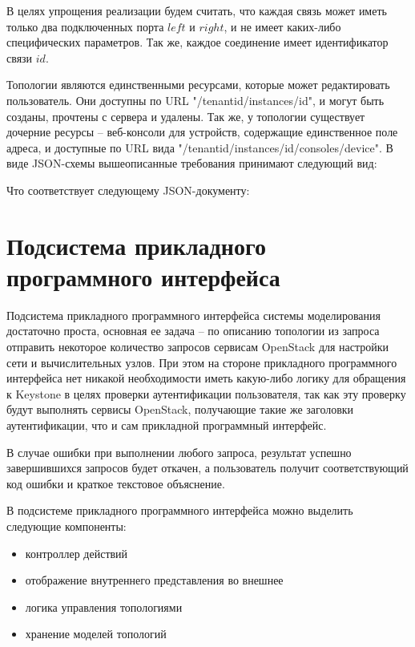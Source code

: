 В целях упрощения реализации будем считать, что каждая связь может иметь только два 
подключенных порта  $left$ и $right$, и не имеет каких-либо специфических параметров.
Так же, каждое соединение имеет идентификатор связи $id$.

Топологии являются единственными ресурсами, которые может редактировать пользователь.
Они доступны по URL "/{tenantid}/instances/{id}", и могут быть созданы, прочтены с сервера и удалены.
Так же, у топологии существует дочерние ресурсы -- веб-консоли для устройств,
содержащие единственное поле адреса, и доступные по URL вида "/{tenantid}/instances/{id}/consoles/{device}".
В виде JSON-схемы вышеописанные требования принимают следующий вид:



Что соответствует следующему JSON-документу:




\section{Подсистема прикладного программного интерфейса}
Подсистема прикладного программного интерфейса системы моделирования достаточно проста,
основная ее задача -- по описанию топологии из запроса отправить некоторое количество
запросов сервисам OpenStack для настройки сети и вычислительных узлов.
При этом на стороне прикладного программного интерфейса нет никакой необходимости 
иметь какую-либо логику для обращения к Keystone в целях проверки аутентификации пользователя,
так как эту проверку будут выполнять сервисы OpenStack, получающие такие же заголовки
аутентификации, что и сам прикладной программный интерфейс.

В случае ошибки при выполнении любого запроса, результат успешно завершившихся запросов
будет откачен, а пользователь получит соответствующий код ошибки и краткое текстовое объяснение.

В подсистеме прикладного программного интерфейса можно выделить следующие компоненты:
\begin{itemize}
    \item контроллер действий
    \item отображение внутреннего представления во внешнее
    \item логика управления топологиями
    \item хранение моделей топологий
\end{itemize}

